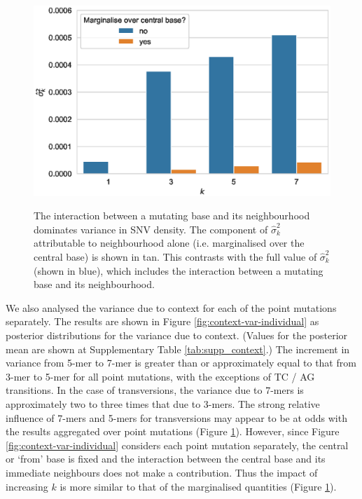 \begin{figure}[h!]
\begin{center}
\includegraphics[width=0.75\columnwidth]{figs/context-var.eps}
\caption{The interaction between a mutating base and its neighbourhood dominates variance in SNV density. The component of $\hat\sigma^2_k$ attributable to neighbourhood alone (i.e. marginalised over the central base) is shown in tan. This contrasts with the full value of $\hat\sigma^2_k$ (shown in blue), which includes the interaction between a mutating base and its neighbourhood.}
{\label{fig:context-var}}
\end{center}
\end{figure}

We also analysed the variance due to context for each of the point mutations separately. The results are shown in Figure \ref{fig:context-var-individual} as posterior distributions for the variance due to context. (Values for the posterior mean are shown at Supplementary Table \ref{tab:supp_context}.) The increment in variance from 5-mer to 7-mer is greater than or approximately equal to that from 3-mer to 5-mer for all  point mutations, with the exceptions of T\textrightarrow C / A\textrightarrow G transitions. In the case of transversions, the variance due to 7-mers is approximately two to three times that due to 3-mers. The strong relative influence of 7-mers and 5-mers for transversions may appear to be at odds with the results aggregated over point mutations (Figure \ref{fig:context-var}). However, since Figure \ref{fig:context-var-individual} considers each point mutation separately, the central or `from' base is fixed and the interaction between the central base and its immediate neighbours does not make a contribution. Thus the impact of increasing $k$ is more similar to that of the marginalised quantities (Figure \ref{fig:context-var}).

